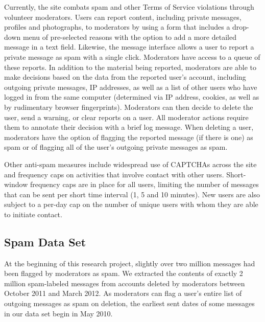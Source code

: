 \documentclass[preprint]{acm_proc_article-sp}
\begin{document}
Currently, the site combats spam and other Terms of Service violations 
through volunteer moderators. Users can report content, including private messages, 
profiles and photographs, to moderators by using a form that includes a drop-down menu of 
pre-selected reasons with the option to add a more detailed message in a text field. 
Likewise, the message interface allows a user to report a private message as spam with a single 
click. Moderators have access to a queue of these reports. In addition to the material 
being reported, moderators are able to make decisions based on the data from the reported 
user's account, including outgoing private messages, IP addresses, as well as a list of 
other users who have logged in from the same computer (determined via IP address, cookies, as well 
as by rudimentary browser fingerprints). Moderators can then decide to delete the user, send a warning, 
or clear reports on a user. All moderator actions require them to annotate their decision with a 
brief log message. When deleting a user, moderators have the option of flagging the 
reported message (if there is one) as spam or of flagging all of the user's outgoing private messages 
as spam.

Other anti-spam measures include widespread use of CAPTCHAs across the site and 
frequency caps on activities that involve contact with other users. Short-window 
frequency caps are in place for all users, limiting the 
number of messages that can be sent per short time interval (1, 5 and 10 minutes). New users 
are also subject to a per-day cap on the number of unique users with whom they are able to initiate 
contact. 


\subsection{Spam Data Set}

At the beginning of this research project, slightly over two million messages had 
been flagged by moderators as spam. We extracted the contents of exactly 2 million 
spam-labeled messages from accounts deleted by moderators between October 2011 
and March 2012. As moderators can flag a user's entire list of outgoing messages 
as spam on deletion, the earliest sent dates of some messages in our data set begin in 
May 2010. 
\end{document}
